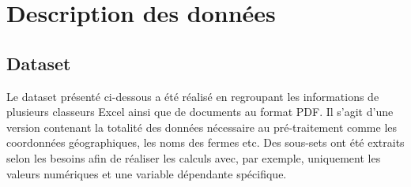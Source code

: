 \appendix

\chapter{Description des données}
\label{annexeDataset}
\section{Dataset}
Le dataset présenté ci-dessous a été réalisé en regroupant les informations de plusieurs classeurs Excel ainsi que de documents au format PDF. Il s'agit d'une version contenant la totalité des données nécessaire au pré-traitement comme les coordonnées géographiques, les noms des fermes etc. Des sous-sets ont été extraits selon les besoins afin de réaliser les calculs avec, par exemple, uniquement les valeurs numériques et une variable dépendante spécifique. 



